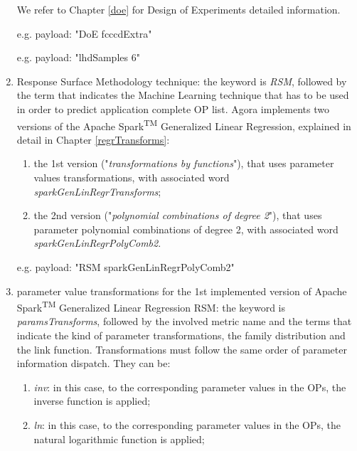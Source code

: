 \begin{enumerate}
\begin{enumerate}
    \end{enumerate}
    
    We refer to Chapter \ref{doe} for Design of Experiments detailed information.
    
    e.g. payload: "DoE fcccdExtra"
    
    e.g. payload: "lhdSamples 6"
    
    \item Response Surface Methodology technique: the keyword is \textit{RSM}, followed by the term that indicates the Machine Learning technique that has to be used in order to predict application complete OP list. Agora implements two versions of the Apache Spark\textsuperscript{TM} Generalized Linear Regression, explained in detail in Chapter \ref{regrTransforms}:
    
    \begin{enumerate}
    
        \item the 1st version ("\textit{transformations by functions}"), that uses parameter values transformations, with associated word \textit{sparkGenLinRegrTransforms};
        
        \item the 2nd version ("\textit{polynomial combinations of degree 2}"), that uses parameter polynomial combinations of degree 2, with associated word \textit{sparkGenLinRegrPolyComb2}.
    
    \end{enumerate}
    
    e.g. payload: "RSM sparkGenLinRegrPolyComb2"
    
    \item parameter value transformations for the 1st implemented version of Apache Spark\textsuperscript{TM} Generalized Linear Regression RSM: the keyword is \textit{paramsTransforms}, followed by the involved metric name and the terms that indicate the kind of parameter transformations, the family distribution and the link function. Transformations must follow the same order of parameter information dispatch. They can be:
    
    \begin{enumerate}
    
        \item \textit{inv}: in this case, to the corresponding parameter values in the OPs, the inverse function is applied;
        
        \item \textit{ln}: in this case, to the corresponding parameter values in the OPs, the natural logarithmic function is applied;
        

\end{enumerate}
\end{enumerate}
